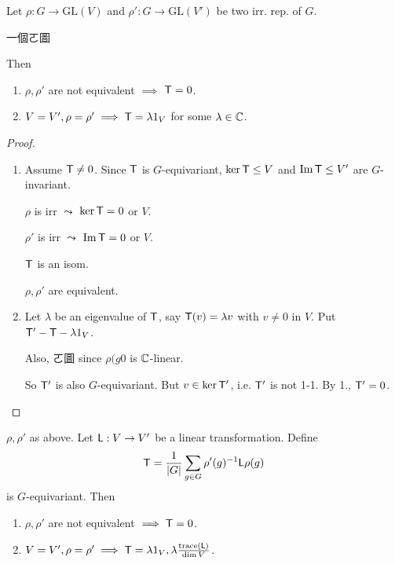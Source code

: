 \begin{lemma}
  Let $\rho: G \to \text{GL}(V)$ and $\rho': G\to \text{GL}(V')$ be two irr.
  rep. of $G$.
  
  一個ㄛ圖

  Then
  \begin{enumerate}
    \item $\rho, \rho'$ are not equivalent $\implies$ ${\sf T} = 0$.
    \item $V = V', \rho = \rho' \implies {\sf T} = \lambda 1_V$ for some
      $\lambda \in \mathbb{C}$.
  \end{enumerate}

  \begin{proof}
    \begin{enumerate}
      \item Assume ${\sf T} \ne 0$. Since ${\sf T}$ is $G$-equivariant,
        $\ker {\sf T} \le V$ and $\operatorname{Im} {\sf T}\le V'$ are $G$-invariant.

        $\rho$ is irr $\leadsto$ $\ker {\sf T} = 0$ or $V$.

        $\rho'$ is irr $\leadsto$ $\operatorname{Im} {\sf T} = 0$ or $V$.

        ${\sf T}$ is an isom.

        $\rho, \rho'$ are equivalent.

      \item  Let $\lambda$ be an eigenvalue of ${\sf T}$, say
        ${\sf T}(v) = \lambda v$ with $v \ne 0$ in $V$.
        Put ${\sf T}' - {\sf T} - \lambda 1_V$.

        Also, ㄛ圖 since $\rho(g0$ is $\mathbb{C}$-linear.

        So ${\sf T}'$ is also $G$-equivariant. But $v \in \ker {\sf T}'$,
        i.e. ${\sf T}'$ is not 1-1. By 1., ${\sf T'} = 0$.
    \end{enumerate}
  \end{proof}
\end{lemma}

\begin{coro}
  $\rho, \rho'$ as above. Let ${\sf L}: V \to V'$ be a linear transformation.
  Define
  \[
    {\sf T} = \frac{1}{\lvert G\rvert} \sum_{g\in G} \rho'(g)^{-1} {\sf L} \rho(g)
  \]
  is $G$-equivariant. Then
  \begin{enumerate}
    \item $\rho, \rho'$ are not equivalent $\implies {\sf T} = 0$.
    \item $V = V', \rho = \rho' \implies {\sf T} = \lambda 1_V,
      \lambda \frac{\operatorname{trace}({\sf L})}{\dim V}$.
  \end{enumerate}
\end{coro}

